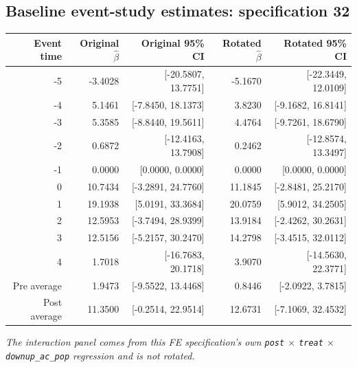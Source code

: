 \documentclass[10pt]{article}
\begin{document}
\subsection*{Baseline event-study estimates: specification 32}
\begin{center}
\scriptsize
\begin{tabular}{r rr rr}
\toprule
Event time & Original $\hat\beta$ & Original 95\% CI & Rotated $\hat\beta$ & Rotated 95\% CI \\
\midrule
-5 & -3.4028 & [-20.5807, 13.7751] & -5.1670 & [-22.3449, 12.0109] \\
-4 & 5.1461 & [-7.8450, 18.1373] & 3.8230 & [-9.1682, 16.8141] \\
-3 & 5.3585 & [-8.8440, 19.5611] & 4.4764 & [-9.7261, 18.6790] \\
-2 & 0.6872 & [-12.4163, 13.7908] & 0.2462 & [-12.8574, 13.3497] \\
-1 & 0.0000 & [0.0000, 0.0000] & 0.0000 & [0.0000, 0.0000] \\
0 & 10.7434 & [-3.2891, 24.7760] & 11.1845 & [-2.8481, 25.2170] \\
1 & 19.1938 & [5.0191, 33.3684] & 20.0759 & [5.9012, 34.2505] \\
2 & 12.5953 & [-3.7494, 28.9399] & 13.9184 & [-2.4262, 30.2631] \\
3 & 12.5156 & [-5.2157, 30.2470] & 14.2798 & [-3.4515, 32.0112] \\
4 & 1.7018 & [-16.7683, 20.1718] & 3.9070 & [-14.5630, 22.3771] \\
\midrule
Pre average & 1.9473 & [-9.5522, 13.4468] & 0.8446 & [-2.0922, 3.7815] \\
Post average & 11.3500 & [-0.2514, 22.9514] & 12.6731 & [-7.1069, 32.4532] \\
\bottomrule
\end{tabular}
\end{center}
\medskip
\textit{The interaction panel comes from this FE specification's own \texttt{post} $\times$ \texttt{treat} $\times$ \texttt{downup\_ac\_pop} regression and is not rotated.}
\clearpage
\end{document}
